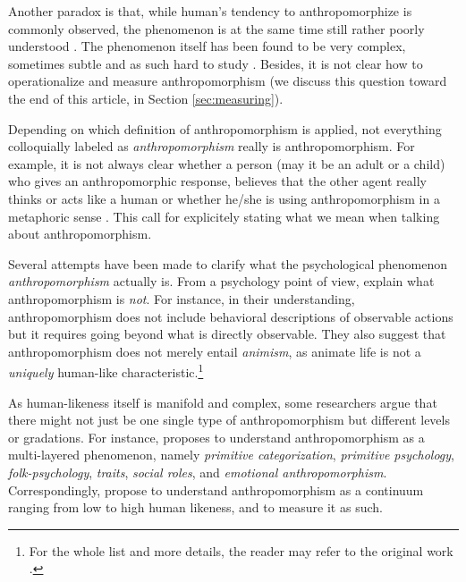 \documentclass{frontiersSCNS} %
\begin{document}
Another paradox is that, while human's tendency to anthropomorphize is commonly
observed, the phenomenon is at the same time still rather poorly understood
\citep{epley_seeing_2007}. The phenomenon itself has been found to be very
complex, sometimes subtle and as such hard to study
\citep{duffy_anthropomorphism_2002,epley_when_2008}. Besides, it is not clear
how to operationalize and measure anthropomorphism (we discuss this question
toward the end of this article, in Section \ref{sec:measuring}).

Depending on which definition of anthropomorphism is applied, not everything
colloquially labeled as \emph{anthropomorphism} really is anthropomorphism.  For
example, it is not always clear whether a person (may it be an adult or a child)
who gives an anthropomorphic response, believes that the other agent really
thinks or acts like a human or whether he/she is using anthropomorphism in a
metaphoric sense \citep{leeds_childrens_1992}.  This call for explicitely
stating what we mean when talking about anthropomorphism. 

Several attempts have been made to clarify what the psychological phenomenon
\emph{anthropomorphism} actually is.  From a psychology point of view,
\citet{epley_when_2008} explain what anthropomorphism is \textit{not}. For
instance, in their understanding, anthropomorphism does not include behavioral
descriptions of observable actions but it requires going beyond what is directly
observable. They also suggest that anthropomorphism does not merely entail
\textit{animism}, as animate life is not a \textit{uniquely} human-like
characteristic.\footnote{For the whole list and more details, the reader may
refer to the original work \citep{epley_when_2008}.}

As human-likeness itself is manifold and complex, some researchers argue that
there might not just be one single type of anthropomorphism but different levels
or gradations. For instance, \citet{persson_anthropomorphism_2000} proposes to
understand anthropomorphism as a multi-layered phenomenon, namely
\emph{primitive categorization}, \emph{primitive psychology},
\emph{folk-psychology}, \emph{traits}, \emph{social roles}, and \emph{emotional
anthropomorphism}. Correspondingly, \citet{ruijten_introducing_2014} propose to
understand anthropomorphism as a continuum ranging from low to high human
likeness, and to measure it as such.
\end{document}
